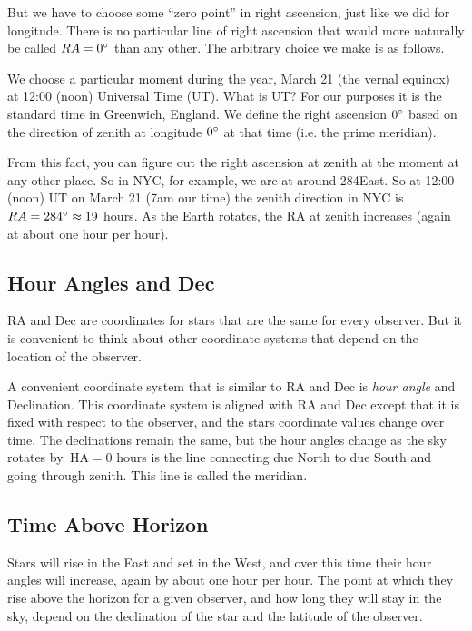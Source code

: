 \documentclass[12pt, preprint]{aastex}
\begin{document}
But we have to choose some ``zero point'' in right ascension, just
like we did for longitude. There is no particular line of right
ascension that would more naturally be called $RA=0{}^\circ$ than any
other. The arbitrary choice we make is as follows.

We choose a particular moment during the year, March 21 (the vernal
equinox) at 12:00 (noon) Universal Time (UT). What is UT? For our
purposes it is the standard time in Greenwich, England. We define the
right ascension $0{}^\circ$ based on the direction of zenith at
longitude $0{}^\circ$ at that time (i.e. the prime meridian).

From this fact, you can figure out the right ascension at zenith at
the moment at any other place. So in NYC, for example, we are at
around 284\degree East. So at 12:00 (noon) UT on March 21 (7am our
time) the zenith direction in NYC is $RA=284{}^\circ\approx 19$
hours. As the Earth rotates, the RA at zenith increases (again at
about one hour per hour).

\subsection{Hour Angles and Dec}

RA and Dec are coordinates for stars that are the same for every
observer. But it is convenient to think about other coordinate systems
that depend on the location of the observer.

A convenient coordinate system that is similar to RA and Dec is {\it
  hour angle} and Declination. This coordinate system is aligned with
RA and Dec except that it is fixed with respect to the observer, and
the stars coordinate values change over time. The declinations remain
the same, but the hour angles change as the sky rotates by. HA$=0$
hours is the line connecting due North to due South and going through
zenith. This line is called the meridian.

\subsection{Time Above Horizon}

Stars will rise in the East and set in the West, and over this time
their hour angles will increase, again by about one hour per hour. The
point at which they rise above the horizon for a given observer, and
how long they will stay in the sky, depend on the declination of the
star and the latitude of the observer.
\end{document}
